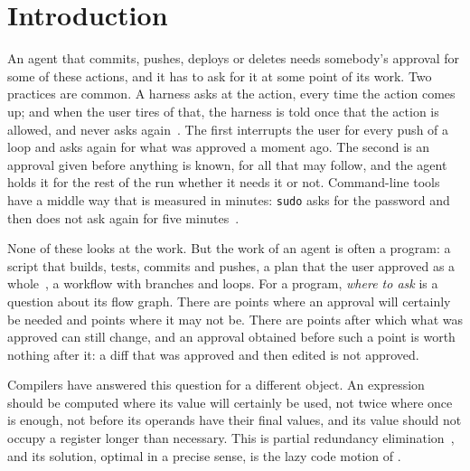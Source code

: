 \documentclass[acmsmall,nonacm,screen]{acmart}
\begin{document}
\section{Introduction}

An agent that commits, pushes, deploys or deletes needs somebody's approval for some of
these actions, and it has to ask for it at some point of its work. Two practices are
common. A harness asks at the action, every time the action comes up; and when the user
tires of that, the harness is told once that the action is allowed, and never asks
again~\cite{claudecodepermissions}. The first interrupts the user for every push of a loop
and asks again for what was approved a moment ago. The second is an approval given before
anything is known, for all that may follow, and the agent holds it for the rest of the run
whether it needs it or not. Command-line tools have a middle way that is measured in
minutes: \texttt{sudo} asks for the password and then does not ask again for five
minutes~\cite{sudoers}.

None of these looks at the work. But the work of an agent is often a program: a script
that builds, tests, commits and pushes, a plan that the user approved as a
whole~\cite{tpp11}, a workflow with branches and loops. For a program, \emph{where to ask} is
a question about its flow graph. There are points where an approval will certainly be
needed and points where it may not be. There are points after which what was approved can
still change, and an approval obtained before such a point is worth nothing after it: a
diff that was approved and then edited is not approved.

Compilers have answered this question for a different object. An expression should be
computed where its value will certainly be used, not twice where once is enough, not before
its operands have their final values, and its value should not occupy a register longer
than necessary. This is partial redundancy elimination~\cite{morel1979}, and its solution,
optimal in a precise sense, is the lazy code motion of \citet{knoop1992,knoop1994}.
\end{document}
